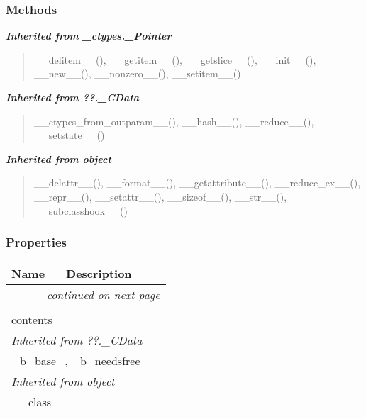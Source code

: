 
  \subsubsection{Methods}


\large{\textbf{\textit{Inherited from \_ctypes.\_Pointer}}}

\begin{quote}
\_\_delitem\_\_(), \_\_getitem\_\_(), \_\_getslice\_\_(), \_\_init\_\_(), \_\_new\_\_(), \_\_nonzero\_\_(), \_\_setitem\_\_()
\end{quote}

\large{\textbf{\textit{Inherited from ??.\_CData}}}

\begin{quote}
\_\_ctypes\_from\_outparam\_\_(), \_\_hash\_\_(), \_\_reduce\_\_(), \_\_setstate\_\_()
\end{quote}

\large{\textbf{\textit{Inherited from object}}}

\begin{quote}
\_\_delattr\_\_(), \_\_format\_\_(), \_\_getattribute\_\_(), \_\_reduce\_ex\_\_(), \_\_repr\_\_(), \_\_setattr\_\_(), \_\_sizeof\_\_(), \_\_str\_\_(), \_\_subclasshook\_\_()
\end{quote}


  \subsubsection{Properties}

    \vspace{-1cm}
\hspace{\varindent}\begin{longtable}{|p{\varnamewidth}|p{\vardescrwidth}|l}
\cline{1-2}
\cline{1-2} \centering \textbf{Name} & \centering \textbf{Description}& \\
\cline{1-2}
\endhead\cline{1-2}\multicolumn{3}{r}{\small\textit{continued on next page}}\\\endfoot\cline{1-2}
\endlastfoot\multicolumn{2}{|l|}{\textit{Inherited from \_ctypes.\_Pointer}}\\
\multicolumn{2}{|p{\varwidth}|}{\raggedright contents}\\
\cline{1-2}
\multicolumn{2}{|l|}{\textit{Inherited from ??.\_CData}}\\
\multicolumn{2}{|p{\varwidth}|}{\raggedright \_b\_base\_, \_b\_needsfree\_}\\
\cline{1-2}
\multicolumn{2}{|l|}{\textit{Inherited from object}}\\
\multicolumn{2}{|p{\varwidth}|}{\raggedright \_\_class\_\_}\\
\cline{1-2}
\end{longtable}

